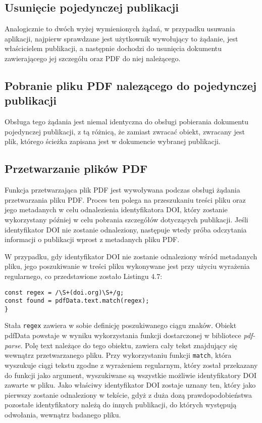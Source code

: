 \documentclass[a4paper,12pt,twoside,openany]{report}
\begin{document}
\subsection{Usunięcie pojedynczej publikacji}
Analogicznie to dwóch wyżej wymienionych żądań, w przypadku usuwania aplikacji, najpierw sprawdzane jest użytkownik wywołujący to żądanie, jest właścicielem publikacji, a następnie dochodzi do usunięcia dokumentu zawierającego jej szczegółu oraz PDF do niej należącego.

\subsection{Pobranie pliku PDF nalezącego do pojedynczej publikacji}
Obsługa tego żądania jest niemal identyczna do obsługi pobierania dokumentu pojedynczej publikacji, z tą różnicą, że zamiast zwracać obiekt, zwracany jest plik, którego ścieżka zapisana jest w dokumencie wybranej publikacji.

\subsection{Przetwarzanie plików PDF}
Funkcja przetwarzająca plik PDF jest wywoływana podczas obsługi żądania przetwarzania pliku PDF. Proces ten polega na przeszukaniu treści pliku oraz jego metadanych w celu odnalezienia identyfikatora DOI, który zostanie wykorzystany później w celu pobrania szczegółów dotyczących publikacji. Jeśli identyfikator DOI nie zostanie odnaleziony, następuje wtedy próba odczytania informacji o publikacji wprost z metadanych pliku PDF.

W przypadku, gdy identyfikator DOI nie zostanie odnaleziony wśród metadanych pliku, jego poszukiwanie w treści pliku wykonywane jest przy użyciu wyrażenia regularnego, co przedstawione zostało Listingu 4.7:

\begin{lstlisting}[caption=Wykorzystanie wyrażenia regularnego do poszukiwania DOI,label=code1,captionpos=b]
const regex = /\S+(doi.org)\S+/g;
const found = pdfData.text.match(regex);
}
\end{lstlisting}
Stała \verb|regex| zawiera w sobie definicję poszukiwanego ciągu znaków. Obiekt pdfData powstaje w wyniku wykorzystania funkcji dostarczonej w bibliotece \textit{pdf-parse}. Polę text należące do tego obiektu, zawiera cały tekst znajdujący się wewnątrz przetwarzanego pliku. Przy wykorzystaniu funkcji \verb|match|, która wyszukuje ciągi tekstu zgodne z wyrażeniem regularnym, który został przekazany do funkcji jako argument, wyszukiwane są wszystkie możliwie identyfikatory DOI zawarte w pliku. Jako właściwy identyfikator DOI zostaje uznany ten, który jako pierwszy zostanie odnaleziony w tekście, gdyż z duża dozą prawdopodobieństwa pozostałe identyfikatory należą do innych publikacji, do których występują odwołania, wewnątrz badanego pliku.
\end{document}

